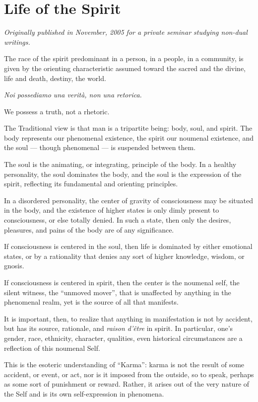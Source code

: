 \section{Life of the Spirit}

\textit{Originally published in November, 2005 for a private seminar studying non-dual writings.}

\begin{quotex}
The race of the spirit predominant in a person, in a people, in a community, is given by the orienting characteristic assumed toward the sacred and the divine, life and death, destiny, the world.

\textit{Noi possediamo una verità, non una retorica.}

We possess a truth, not a rhetoric.
\end{quotex}


The Traditional view is that man is a tripartite being: body, soul, and spirit. The body represents our phenomenal existence, the spirit our noumenal existence, and the soul --- though phenomenal --- is suspended between them.

The soul is the animating, or integrating, principle of the body. In a healthy personality, the soul dominates the body, and the soul is the expression of the spirit, reflecting its fundamental and orienting principles.

In a disordered personality, the center of gravity of consciousness may be situated in the body, and the existence of higher states is only dimly present to consciousness, or else totally denied. In such a state, then only the desires, pleasures, and pains of the body are of any significance.

If consciousness is centered in the soul, then life is dominated by either emotional states, or by a rationality that denies any sort of higher knowledge, wisdom, or gnosis.

If consciousness is centered in spirit, then the center is the noumenal self, the silent witness, the ``unmoved mover'', that is unaffected by anything in the phenomenal realm, yet is the source of all that manifests.

It is important, then, to realize that anything in manifestation is not by accident, but has its source, rationale, and \emph{raison d'être} in spirit. In particular, one's gender, race, ethnicity, character, qualities, even historical circumstances are a reflection of this noumenal Self.

This is the esoteric understanding of ``Karma'': karma is not the result of some accident, or event, or act, nor is it imposed from the outside, so to speak, perhaps as some sort of punishment or reward. Rather, it arises out of the very nature of the Self and is its own self-expression in phenomena.

